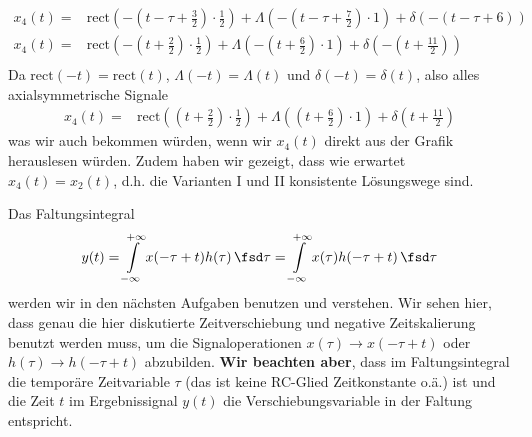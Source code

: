 \begin{Loesung}
\begin{align}
x_4(t) = &\mathrm{rect}(-\left(t-\tau+\frac{3}{2}\right)\cdot \frac{1}{2}) + \Lambda(-\left(t-\tau+\frac{7}{2}\right)\cdot 1) + \delta(-(t-\tau+6))\\
x_4(t) = &\mathrm{rect}(-\left(t+\frac{2}{2}\right)\cdot \frac{1}{2}) + \Lambda(-\left(t+\frac{6}{2}\right)\cdot 1) + \delta(-(t+\frac{11}{2}))\\
\end{align}
Da $\mathrm{rect}(-t)=\mathrm{rect}(t)$, $\Lambda(-t)=\Lambda(t)$ und $\delta(-t) = \delta(t)$, also alles axialsymmetrische Signale
\begin{align}
x_4(t) = &\mathrm{rect}(\left(t+\frac{2}{2}\right)\cdot \frac{1}{2}) + \Lambda(\left(t+\frac{6}{2}\right)\cdot 1) + \delta(t+\frac{11}{2})
\end{align}
was wir auch bekommen würden, wenn wir $x_4(t)$ direkt aus der Grafik herauslesen würden. Zudem haben wir gezeigt, dass wie erwartet $x_4(t)=x_2(t)$, d.h. die Varianten I und II konsistente Lösungswege sind.

\end{Loesung}

\begin{Werkzeug}
Das Faltungsintegral
\begin{equation}
y(t)
= \int\limits_{-\infty}^{+\infty} x(-\tau+t) h(\tau) \, \fsd \tau
= \int\limits_{-\infty}^{+\infty} x(\tau) h(-\tau+t) \, \fsd \tau
\end{equation}
werden wir in den nächsten Aufgaben benutzen und verstehen.
%
Wir sehen hier, dass genau die hier
diskutierte Zeitverschiebung und negative Zeitskalierung benutzt werden muss, um
die Signaloperationen $x(\tau) \rightarrow x(-\tau+t)$
oder $h(\tau) \rightarrow h(-\tau+t)$ abzubilden.
\textbf{Wir beachten aber}, dass im Faltungsintegral die temporäre Zeitvariable
$\tau$ (das ist keine RC-Glied Zeitkonstante o.ä.) ist und die Zeit $t$
im Ergebnissignal $y(t)$ die Verschiebungsvariable in der Faltung entspricht.
\end{Werkzeug}

